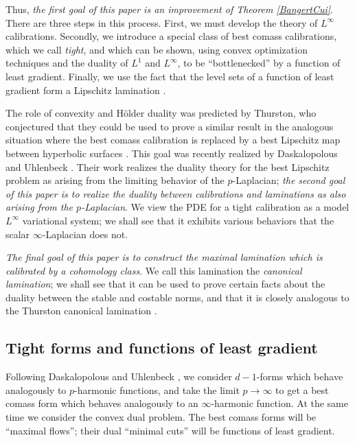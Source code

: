 \documentclass[reqno,11pt]{amsart}
\newcommand{\dfn}[1]{\emph{#1}\index{#1}}
\theoremstyle{definition}
\numberwithin{equation}{section}
\begin{document}
Thus, \emph{the first goal of this paper is an improvement of Theorem \ref{BangertCui}}.
There are three steps in this process.
First, we must develop the theory of $L^\infty$ calibrations.
Secondly, we introduce a special class of best comass calibrations, which we call \dfn{tight}, and which can be shown, using convex optimization techniques and the duality of $L^1$ and $L^\infty$, to be ``bottlenecked'' by a function of least gradient.
Finally, we use the fact that the level sets of a function of least gradient form a Lipschitz lamination \cite{BackusCML}.

The role of convexity and H\"older duality was predicted by Thurston, who conjectured that they could be used to prove a similar result in the analogous situation where the best comass calibration is replaced by a best Lipschitz map between hyperbolic surfaces \cite{Thurston98}.
This goal was recently realized by Daskalopolous and Uhlenbeck \cite{daskalopoulos2020transverse,daskalopoulos2022,daskalopoulos2023}.
Their work realizes the duality theory for the best Lipschitz problem as arising from the limiting behavior of the $p$-Laplacian; \emph{the second goal of this paper is to realize the duality between calibrations and laminations as also arising from the $p$-Laplacian}.
We view the PDE for a tight calibration as a model $L^\infty$ variational system; we shall see that it exhibits various behaviors that the scalar $\infty$-Laplacian does not.

\emph{The final goal of this paper is to construct the maximal lamination which is calibrated by a cohomology class}.
We call this lamination the \dfn{canonical lamination}; we shall see that it can be used to prove certain facts about the duality between the stable and costable norms, and that it is closely analogous to the Thurston canonical lamination \cite{Thurston98}.

\subsection{Tight forms and functions of least gradient}
Following Daskalopolous and Uhlenbeck \cite{daskalopoulos2020transverse}, we consider $d - 1$-forms which behave analogously to $p$-harmonic functions, and take the limit $p \to \infty$ to get a best comass form which behaves analogously to an $\infty$-harmonic function.
At the same time we consider the convex dual problem.
The best comass forms will be ``maximal flows''; their dual ``minimal cuts'' will be functions of least gradient.
\end{document}
